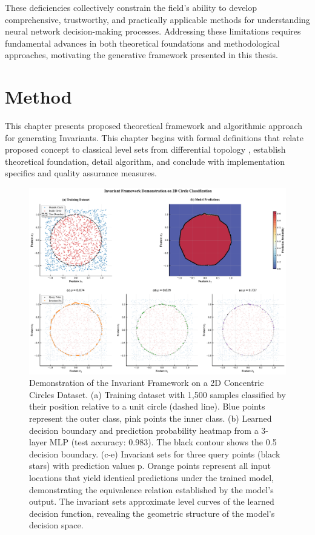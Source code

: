 \documentclass[licencjacka,en]{pracamgr}
\newcommand{\framework}[1]{Invariants}  %
\begin{document}
These deficiencies collectively constrain the field's ability to develop comprehensive, trustworthy, and practically applicable methods for understanding neural network decision-making processes. Addressing these limitations requires fundamental advances in both theoretical foundations and methodological approaches, motivating the generative framework presented in this thesis.
\chapter{Method}\label{r:method}

This chapter presents proposed theoretical framework and algorithmic approach for generating \framework{}. This chapter begins with formal definitions that relate proposed concept to classical level sets from differential topology \citep{lee2013smooth,milnor1965topology,fort2017gaussian}, establish theoretical foundation, detail algorithm, and conclude with implementation specifics and quality assurance measures.

\begin{figure}[h]
\centering
\includegraphics[width=\linewidth]{figures/main/invariant_framework_combined.pdf}
\caption{Demonstration of the Invariant Framework on a 2D Concentric Circles Dataset.
(a) Training dataset with 1,500 samples classified by their position relative to a unit circle (dashed line). Blue points represent the outer class, pink points the inner class.
(b) Learned decision boundary and prediction probability heatmap from a 3-layer MLP (test accuracy: 0.983). The black contour shows the 0.5 decision boundary.
(c-e) Invariant sets for three query points (black stars) with prediction values p. Orange points represent all input locations that yield identical predictions under the trained model, demonstrating the equivalence relation established by the model's output. The invariant sets approximate level curves of the learned decision function, revealing the geometric structure of the model's decision space.}
\label{fig:teaser}
\end{figure}
\end{document}
